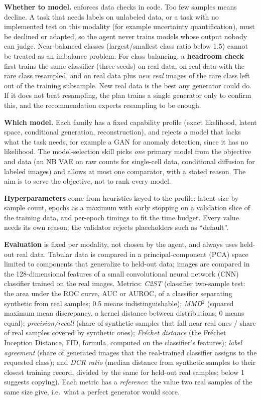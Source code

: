 \documentclass[10pt]{article}
\newcommand{\code}[1]{\texttt{\detokenize{#1}}}
\begin{document}
\textbf{Whether to model.} \code{validate_objective.py} enforces data checks in code. Too few samples means decline. A
task that needs labels on unlabeled data, or a task with no implemented test on this modality (for example uncertainty
quantification), must be declined or adapted, so the agent never trains models whose output nobody can judge.
Near-balanced classes (largest/smallest class ratio below 1.5) cannot be treated as an imbalance problem. For class
balancing, a \textbf{headroom check} first trains the same classifier (three seeds) on real data, on real data with the
rare class resampled, and on real data plus \emph{new real} images of the rare class left out of the training
subsample. New real data is the best any generator could do. If it does not beat resampling, the plan trains a single
generator only to confirm this, and the recommendation expects resampling to be enough.

\textbf{Which model.} Each family has a fixed capability profile (exact likelihood, latent space, conditional
generation, reconstruction), and \code{validate_plan.py} rejects a model that lacks what the task needs, for example a
GAN for anomaly detection, since it has no likelihood. The model-selection skill picks \emph{one} primary model from the
objective and data (an NB VAE on raw counts for single-cell data, conditional diffusion for labeled images) and allows at
most one comparator, with a stated reason. The aim is to serve the objective, not to rank every model.

\textbf{Hyperparameters} come from heuristics keyed to the profile: latent size by sample count, epochs as a maximum with
early stopping on a validation slice of the training data, and per-epoch timings to fit the time budget. Every value
needs its own reason; the validator rejects placeholders such as ``default''.

\textbf{Evaluation} is fixed per modality, not chosen by the agent, and always uses held-out real data. Tabular data is
compared in a principal-component (PCA) space limited to components that generalize to held-out data; images are compared
in the 128-dimensional features of a small convolutional neural network (CNN) classifier trained on the real images. Metrics:
\emph{C2ST} (classifier two-sample test: the area under the ROC curve, AUC or AUROC, of a classifier separating synthetic
from real samples; 0.5 means indistinguishable); \emph{MMD$^2$} (squared maximum mean discrepancy, a kernel distance between distributions; 0 means
equal); \emph{precision/recall} (share of synthetic samples that fall near real ones / share of real samples covered by
synthetic ones); \emph{Fr\'echet distance} (the Fr\'echet Inception Distance, FID, formula, computed on the classifier's features); \emph{label agreement} (share of
generated images that the real-trained classifier assigns to the requested class); and \emph{DCR ratio} (median distance
from synthetic samples to their closest training record, divided by the same for held-out real samples; below 1 suggests
copying). Each metric has a \emph{reference}: the value two real samples of the same size give, i.e.\ what a perfect
generator would score.
\end{document}
